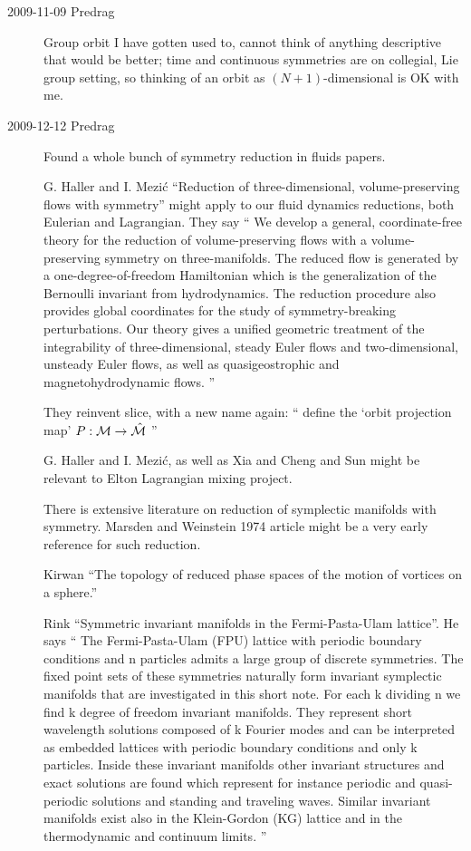 \begin{description}
\item[2009-11-09 Predrag]
Group orbit I have gotten used to, cannot think of anything descriptive
that would be better; time and continuous symmetries are on collegial,
Lie group setting, so thinking of an orbit as $(N+1)$-dimensional is OK
with me.

\renewcommand{\LieEl}{\ensuremath{g}}  %
\renewcommand{\gSpace}{\ensuremath{\theta}}   %
\renewcommand{\ssp}{x}

\item[2009-12-12 Predrag] Found a whole bunch of symmetry
reduction in fluids papers.

G. Haller and I. Mezi\'c
``Reduction of three-dimensional, volume-preserving flows
with symmetry''
might apply to our fluid dynamics reductions, both
Eulerian and Lagrangian.
They say ``
We develop a general, coordinate-free theory for the reduction
of volume-preserving flows with a volume-preserving symmetry on
three-manifolds. The reduced flow is generated by a
one-degree-of-freedom Hamiltonian which is the generalization
of the Bernoulli invariant from hydrodynamics. The reduction
procedure also provides global coordinates for the study of
symmetry-breaking perturbations. Our theory gives a unified
geometric treatment of the integrability of three-dimensional,
steady Euler flows and two-dimensional, unsteady Euler flows,
as well as quasigeostrophic and magnetohydrodynamic flows.
''

They reinvent slice, with a new name again:
``
define the `orbit projection map'
$P: {\cal M} \to \hat{\cal M} $
''

G. Haller and I. Mezi\'c, as well as Xia
and Cheng and Sun might be relevant to Elton
Lagrangian mixing project.

There is extensive literature on reduction of symplectic manifolds with
symmetry.
Marsden and Weinstein 1974 article
might be a very early reference for such reduction.

Kirwan ``The topology of reduced phase spaces of
the motion of vortices on a sphere.''

 Rink
``Symmetric invariant manifolds in
  the  {Fermi-Pasta-Ulam} lattice''. He says ``
The Fermi-Pasta-Ulam (FPU) lattice with periodic boundary
conditions and n particles admits a large group of discrete
symmetries. The fixed point sets of these symmetries naturally
form invariant symplectic manifolds that are investigated in
this short note. For each k dividing n we find k degree of
freedom invariant manifolds. They represent short wavelength
solutions composed of k Fourier modes and can be interpreted as
embedded lattices with periodic boundary conditions and only k
particles. Inside these invariant manifolds other invariant
structures and exact solutions are found which represent for
instance periodic and quasi-periodic solutions and standing and
traveling waves. Similar invariant manifolds exist also in the
Klein-Gordon (KG) lattice and in the thermodynamic and
continuum limits.
''


\end{description}
